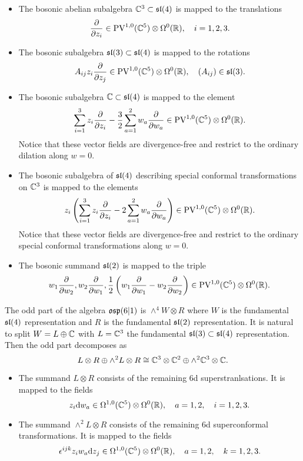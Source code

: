 \documentclass[11pt]{amsart}
\begin{document}
\begin{itemize}

\item
The bosonic abelian subalgebra $\mathbb C^3 \subset \mathfrak{sl}(4)$ is mapped to the translations 
\[
\frac{\partial}{\partial z_i} \in {\rm PV}^{1,0}(\mathbb C^5) \otimes \Omega^0(\mathbb R) , \quad i=1,2,3.
\]

\item
The bosonic subalgebra $\mathfrak{sl}(3) \subset \mathfrak{sl}(4)$ is mapped to the 
rotations
\[
A_{ij} z_i \frac{\partial}{\partial z_j} \in {\rm PV}^{1,0}(\mathbb C^5)\otimes \Omega^0(\mathbb R) , \quad (A_{ij}) \in \mathfrak{sl}(3) .
\]

\item
The bosonic subalgebra $\mathbb C \subset \mathfrak{sl}(4)$ is mapped to the element
\[
\sum_{i=1}^3 z_i \frac{\partial}{\partial z_i} - \frac32 \sum_{a=1}^2 w_a \frac{\partial}{\partial w_a} \in {\rm PV}^{1,0}(\mathbb C^5) \otimes \Omega^0(\mathbb R)  .
\] 
Notice that these vector fields are divergence-free and restrict to the ordinary dilation along $w=0$. 
\item 
The bosonic subalgebra of $\mathfrak{sl}(4)$ describing special conformal transformations on $\mathbb C^3$ is mapped to the elements 
\[
z_i \left(\sum_{i=1}^3 z_i \frac{\partial}{\partial z_i} - 2 \sum_{a=1}^2 w_a \frac{\partial}{\partial w_a} \right) \in {\rm PV}^{1,0}(\mathbb C^5) \otimes \Omega^0(\mathbb R) .
\] 
Notice that these vector fields are divergence-free and restrict to the ordinary special conformal transformations along $w=0$. 
\item 
The bosonic summand $\mathfrak{sl}(2)$ is mapped to the triple
\[
w_1 \frac{\partial}{\partial w_2}, w_2 \frac{\partial}{\partial w_1}, \frac12 \left(w_1 \frac{\partial}{\partial w_1} - w_2 \frac{\partial}{\partial w_2}\right) \in {\rm PV}^{1,0}(\mathbb C^5) \otimes \Omega^0(\mathbb R) .
\]
\end{itemize}

The odd part of the algebra $\mathfrak{osp}(6|1)$ is $\wedge^4 W \otimes R$ where $W$ is the fundamental $\mathfrak{sl}(4)$ representation and $R$ is the fundamental $\mathfrak{sl}(2)$ representation. 
It is natural to split $W = L \oplus \mathbb C$ with $L = \mathbb C^3$ the fundamental $\mathfrak{sl}(3) \subset \mathfrak{sl}(4)$ representation. 
Then the odd part decomposes as
\[
L \otimes R \oplus \wedge^2 L \otimes R \cong \mathbb C^3 \otimes \mathbb C^2 \oplus \wedge^2 \mathbb C^3 \otimes \mathbb C .
\]

\begin{itemize} 
\item The summand $L \otimes R$ consists of the remaining 6d superstranlsations. 
It is mapped to the fields 
\[
z_i {\rm d} w_a \in \Omega^{1,0}(\mathbb C^5) \otimes \Omega^0(\mathbb R) ,\quad a=1,2, \quad i =1,2,3.
\] 
\item The summand $\wedge^2 L \otimes R$ consists of the remaining 6d superconformal transformations. 
It is mapped to the fields
\[
\epsilon^{ijk} z_i w_a {\rm d} z_j \in \Omega^{1,0}(\mathbb C^5)\otimes \Omega^0(\mathbb R) , \quad a = 1,2, \quad k = 1,2,3. 
\]
\end{itemize}
\end{document}

